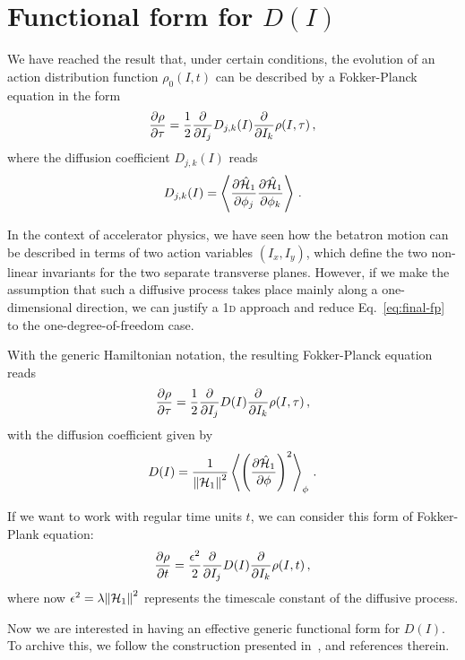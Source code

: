 \section{Functional form for $D(I)$}

We have reached the result that, under certain conditions, the evolution of an action distribution function $\rho_0(I, t)$ can be described by a Fokker-Planck equation in the form
\begin{equation}
    \pdv{\rho}{\tau}=\frac{1}{2}\pdv{}{I_j} D_{j,k}(I) \pdv{}{I_k}\rho(I,\tau)\,,
    \label{eq:final-fp}
\end{equation} 
where the diffusion coefficient $D_{j,k}(I)$ reads
\begin{equation}
    D_{j,k}(I) = \left\langle\pdv{\hat{\mathcal{H}}_1}{\phi_j}\pdv{\hat{\mathcal{H}}_1}{\phi_k}\right\rangle \,.
\end{equation}

In the context of accelerator physics, we have seen how the betatron motion can be described in terms of two action variables $(I_x, I_y)$, which define the two non-linear invariants for the two separate transverse planes. However, if we make the assumption that such a diffusive process takes place mainly along a one-dimensional direction, we can justify a 1\textsc{d} approach and reduce Eq.~\eqref{eq:final-fp} to the one-degree-of-freedom case.

With the generic Hamiltonian notation, the resulting Fokker-Planck equation reads
\begin{equation}
    \pdv{\rho}{\tau}=\frac{1}{2}\pdv{}{I_j} D(I) \pdv{}{I_k}\rho(I,\tau)\,,
\end{equation}
with the diffusion coefficient given by
\begin{equation}
    D(I) = \frac{1}{\norm{\mathcal{H}_1}^2} \left\langle \left( \pdv{\hat{\mathcal{H}}_1}{\phi} \right)^2 \right\rangle_\phi \,.
\end{equation}

If we want to work with regular time units $t$, we can consider this form of Fokker-Plank equation:
\begin{equation}
    \pdv{\rho}{t}=\frac{\epsilon^2}{2}\pdv{}{I_j} D(I) \pdv{}{I_k}\rho(I,t)\,,
    \label{eq:fp}
\end{equation}
where now $\epsilon^2 = \lambda\norm{\mathcal{H}_1}^2$ represents the timescale constant of the diffusive process.

Now we are interested in having an effective generic functional form for $D(I)$. To archive this, we follow the construction presented in~\cite{Bazzani:2019lse}, and references therein.


